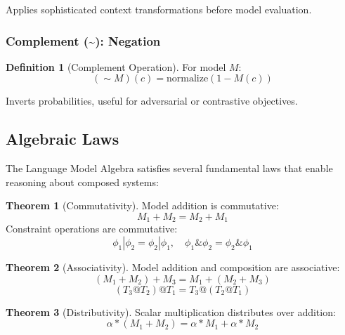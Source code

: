 \documentclass{article}
\theoremstyle{definition}
\newtheorem{definition}{Definition}
\newtheorem{theorem}{Theorem}
\begin{document}
Applies sophisticated context transformations before model evaluation.

\subsubsection{Complement (\~{}): Negation}

\begin{definition}[Complement Operation]
For model $M$:
\begin{equation}
(\sim M)(c) = \text{normalize}(1 - M(c))
\end{equation}
\end{definition}

Inverts probabilities, useful for adversarial or contrastive objectives.

\subsection{Algebraic Laws}

The Language Model Algebra satisfies several fundamental laws that enable reasoning about composed systems:

\begin{theorem}[Commutativity]
Model addition is commutative:
\begin{equation}
M_1 + M_2 = M_2 + M_1
\end{equation}
Constraint operations are commutative:
\begin{equation}
\phi_1 | \phi_2 = \phi_2 | \phi_1, \quad \phi_1 \& \phi_2 = \phi_2 \& \phi_1
\end{equation}
\end{theorem}

\begin{theorem}[Associativity]
Model addition and composition are associative:
\begin{equation}
(M_1 + M_2) + M_3 = M_1 + (M_2 + M_3)
\end{equation}
\begin{equation}
(T_3 @ T_2) @ T_1 = T_3 @ (T_2 @ T_1)
\end{equation}
\end{theorem}

\begin{theorem}[Distributivity]
Scalar multiplication distributes over addition:
\begin{equation}
\alpha * (M_1 + M_2) = \alpha * M_1 + \alpha * M_2
\end{equation}
\end{theorem}
\end{document}
